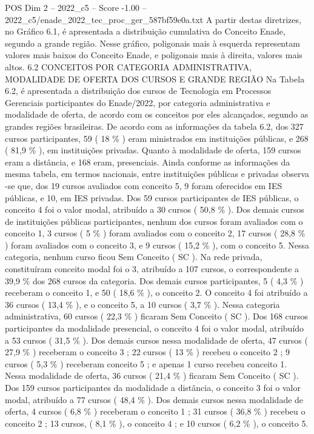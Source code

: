 \begin{textsample}{POS Dim 2 – 2022\_c5 – Score -1.00 – 2022\_c5/enade\_2022\_tec\_proc\_ger\_587bf59e0a.txt}
A partir destas diretrizes, no Gráfico 6.1, é apresentada a distribuição cumulativa do Conceito Enade, segundo a grande região.
Nesse gráfico, poligonais mais à esquerda representam valores mais baixos do Conceito Enade, e poligonais mais à direita, valores mais altos. 6.2 CONCEITOS POR CATEGORIA ADMINISTRATIVA, MODALIDADE DE OFERTA DOS CURSOS E GRANDE REGIÃO Na Tabela 6.2, é apresentada a distribuição dos cursos de Tecnologia em Processos Gerenciais participantes do Enade/2022, por categoria administrativa e modalidade de oferta, de acordo com os conceitos por eles alcançados, segundo as grandes regiões brasileiras.
De acordo com as informações da tabela 6.2, dos 327 cursos participantes, 59 ( 18 \% ) eram ministrados em instituições públicas, e 268 ( 81,9 \% ), em instituições privadas.
Quanto à modalidade de oferta, 159 cursos eram a distância, e 168 eram, presenciais.
Ainda conforme as informações da mesma tabela, em termos nacionais, entre instituições públicas e privadas observa -se que, dos 19 cursos avaliados com conceito 5, 9 foram oferecidos em IES públicas, e 10, em IES privadas.
Dos 59 cursos participantes de IES públicas, o conceito 4 foi o valor modal, atribuído a 30 cursos ( 50,8 \% ).
Dos demais cursos de instituições públicas participantes, nenhum dos cursos foram avaliados com o conceito 1, 3 cursos ( 5 \% ) foram avaliados com o conceito 2, 17 cursos ( 28,8 \% ) foram avaliados com o conceito 3, e 9 cursos ( 15,2 \% ), com o conceito 5.
Nessa categoria, nenhum curso ficou Sem Conceito ( SC ).
Na rede privada, constituíram conceito modal foi o 3, atribuído a 107 cursos, o correspondente a 39,9 \% dos 268 cursos da categoria.
Dos demais cursos participantes, 5 ( 4,3 \% ) receberam o conceito 1, e 50 ( 18,6 \% ), o conceito 2.
O conceito 4 foi atribuído a 36 cursos ( 13,4 \% ), e o conceito 5, a 10 cursos ( 3,7 \% ).
Nessa categoria administrativa, 60 cursos ( 22,3 \% ) ficaram Sem Conceito ( SC ).
Dos 168 cursos participantes da modalidade presencial, o conceito 4 foi o valor modal, atribuído a 53 cursos ( 31,5 \% ).
Dos demais cursos nessa modalidade de oferta, 47 cursos ( 27,9 \% ) receberam o conceito 3 ; 22 cursos ( 13 \% ) recebeu o conceito 2 ; 9 cursos ( 5,3 \% ) receberam conceito 5 ; e apenas 1 curso recebeu conceito 1.
Nessa modalidade de oferta, 36 cursos ( 21,4 \% ) ficaram Sem Conceito ( SC ).
Dos 159 cursos participantes da modalidade a distância, o conceito 3 foi o valor modal, atribuído a 77 cursos ( 48,4 \% ).
Dos demais cursos nessa modalidade de oferta, 4 cursos ( 6,8 \% ) receberam o conceito 1 ; 31 cursos ( 36,8 \% ) recebeu o conceito 2 ; 13 cursos, ( 8,1 \% ), o conceito 4 ; e 10 cursos ( 6,2 \% ), o conceito 5.

\end{textsample}
